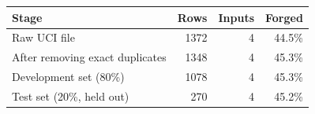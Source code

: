 \begin{tabular}{lrrr}
\toprule
Stage & Rows & Inputs & Forged \\
\midrule
Raw UCI file & 1372 & 4 & 44.5\% \\
After removing exact duplicates & 1348 & 4 & 45.3\% \\
Development set (80\%) & 1078 & 4 & 45.3\% \\
Test set (20\%, held out) & 270 & 4 & 45.2\% \\
\bottomrule
\end{tabular}

